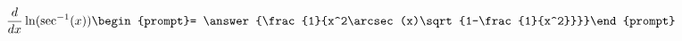\documentclass{ximera}
\author{Steven Gubkin}
\begin{document}
\begin{exercise}

\[
\frac{d}{dx} \ln(\sec^{-1}(x)) \begin{prompt}= \answer{\frac{1}{x^2\arcsec(x)\sqrt{1-\frac{1}{x^2}}}}\end{prompt}
\]



\end{exercise}
\end{document}
